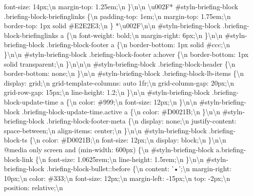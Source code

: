 font-size: 14px;\textbackslash{}n margin-top: 1.25em;\textbackslash{}n
\}\textbackslash{}n\textbackslash{}n \textbackslash{}u002F*
\#styln-briefing-block .briefing-block-briefinglinks \{\textbackslash{}n
padding-top: 1em;\textbackslash{}n margin-top: 1.75em;\textbackslash{}n
border-top: 1px solid \#E2E2E3;\textbackslash{}n \}
*\textbackslash{}u002F\textbackslash{}n\textbackslash{}n
\#styln-briefing-block .briefing-block-briefinglinks a
\{\textbackslash{}n font-weight: bold;\textbackslash{}n margin-right:
6px;\textbackslash{}n \}\textbackslash{}n\textbackslash{}n
\#styln-briefing-block .briefing-block-footer a \{\textbackslash{}n
border-bottom: 1px solid \#ccc;\textbackslash{}n
\}\textbackslash{}n\textbackslash{}n \#styln-briefing-block
.briefing-block-footer a:hover \{\textbackslash{}n border-bottom: 1px
solid transparent;\textbackslash{}n
\}\textbackslash{}n\textbackslash{}n\textbackslash{}n
\#styln-briefing-block .briefing-block-header \{\textbackslash{}n
border-bottom: none;\textbackslash{}n
\}\textbackslash{}n\textbackslash{}n \#styln-briefing-block
.briefing-block-lb-items \{\textbackslash{}n display:
grid;\textbackslash{}n grid-template-columns: auto 1fr;\textbackslash{}n
grid-column-gap: 20px;\textbackslash{}n grid-row-gap:
15px;\textbackslash{}n line-height: 1.2;\textbackslash{}n
\}\textbackslash{}n\textbackslash{}n \#styln-briefing-block
.briefing-block-update-time a \{\textbackslash{}n color:
\#999;\textbackslash{}n font-size: 12px;\textbackslash{}n
\}\textbackslash{}n\textbackslash{}n \#styln-briefing-block
.briefing-block-update-time.active a \{\textbackslash{}n color:
\#D0021B;\textbackslash{}n \}\textbackslash{}n\textbackslash{}n
\#styln-briefing-block .briefing-block-footer-meta \{\textbackslash{}n
display: none;\textbackslash{}n justify-content:
space-between;\textbackslash{}n align-items: center;\textbackslash{}n
\}\textbackslash{}n\textbackslash{}n \#styln-briefing-block
.briefing-block-ts \{\textbackslash{}n color: \#D0021B;\textbackslash{}n
font-size: 12px;\textbackslash{}n display: block;\textbackslash{}n
\}\textbackslash{}n\textbackslash{}n @media only screen and (min-width:
600px) \{\textbackslash{}n \#styln-briefing-block a.briefing-block-link
\{\textbackslash{}n font-size: 1.0625rem;\textbackslash{}n line-height:
1.5rem;\textbackslash{}n \}\textbackslash{}n\textbackslash{}n
\#styln-briefing-block .briefing-block-bullet::before
\{\textbackslash{}n content: '•';\textbackslash{}n margin-right:
10px;\textbackslash{}n color: \#333;\textbackslash{}n font-size:
12px;\textbackslash{}n margin-left: -15px;\textbackslash{}n top:
-2px;\textbackslash{}n position: relative;\textbackslash{}n
